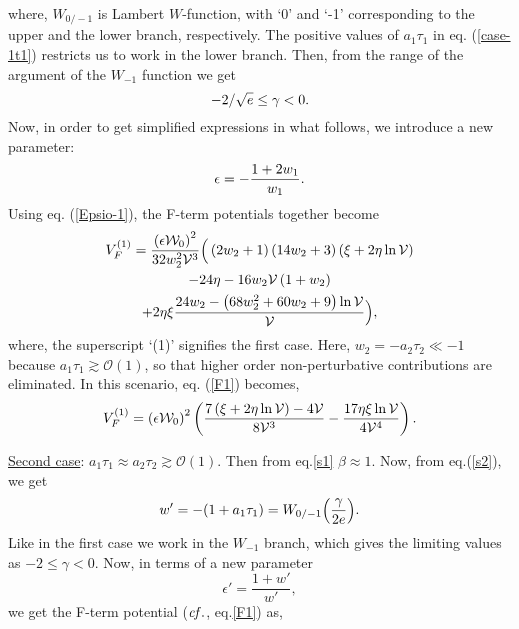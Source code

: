 \documentclass[doublecol]{epl2}
\begin{document}
 where, $W_{0/-1}$ is Lambert $W$-function, with `0' and `-1' corresponding to the upper and the lower branch, respectively.
 The positive values of $a_1\tau_1$ in eq. (\ref{case-1t1}) restricts us to work in the lower branch. Then, from the range of the argument of the  $W_{-1}$ function we get \cite{Basiouris:2021sdf}
 \begin{equation}\small
     -2/\sqrt{e}\leq \gamma < 0 .
 \end{equation}
 Now, in order to get simplified expressions in what follows, we introduce a new parameter:
\begin{equation}\small
    \epsilon=-\frac{1+2 w_1}{w_1} .
    \label{Epsio-1}
\end{equation}
 Using eq. (\ref{Epsio-1}), the F-term potentials together become
 \begin{multline}\small
V_F^{(1)}=\frac{\left(\epsilon\mathcal{W}_0\right)^2}{32w_2^2\mathcal{V}^3}\Big(\left(2w_2+1\right)\left(14w_2+3\right)\left(\xi+2\eta\ln\mathcal{V}\right)\\ -24\eta -16w_2\mathcal{V}\left(1+w_2\right)\\ 
     +2\eta\xi\frac{24w_2-\left(68w_2^2+60w_2+9\right)\ln\mathcal{V}}{\mathcal{V}}\Big), \label{F1}
 \end{multline} where, the superscript `(1)' signifies the first case.
 Here, $w_2=-a_2\tau_2\ll-1$ because $a_1\tau_1\gtrsim \mathcal{O}(1)$, so that higher order non-perturbative contributions are eliminated\cite{Balasubramanian:2004uy}. In this scenario, eq. (\ref{F1}) becomes,
 \begin{equation}\small
   V_F^{(1)}=\left(\epsilon\mathcal{W}_0\right)^2\left(\frac{7\left(\xi+2\eta \ln{\mathcal{V}}\right)-4\mathcal{V}}{8\mathcal{V}^3} - \frac{17\eta\xi\ln{\mathcal{V}}}{4\mathcal{V}^4}\right).
   \label{F1a}
 \end{equation} \par
 \underline{Second case}: $a_1\tau_1\approx a_2\tau_2\gtrsim \mathcal{O}(1)$. Then from eq.\ref{s1} $\beta\approx1$. Now, from eq.(\ref{s2}), we get
 \begin{equation}\small
    w'=-(1+a_1\tau_1)=W_{0/-1}\Big(\frac{\gamma}{2e}\Big).
    \label{case-2 t1,2}
\end{equation}
 Like in the first case we work in the $W_{-1}$ branch, which gives the limiting values as $-2\leq\gamma < 0$. Now, in terms of a new parameter 
 \begin{equation}
     \epsilon'=\frac{1+w'}{w'},
 \end{equation} we get the F-term potential ($\it{cf.}$, eq.\ref{F1}) as,
\end{document}
